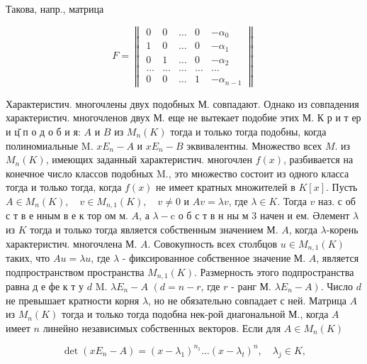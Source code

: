 \documentclass[10pt]{article}
\begin{document}
Такова, напр., матрица



\[

F=\left\|\begin{array}{ccccc}

0 & 0 & \ldots & 0 & -\alpha_{0} \\

1 & 0 & \ldots & 0 & -\alpha_{1} \\

0 & 1 & \ldots & 0 & -\alpha_{2} \\

\ldots & \ldots & \ldots & \ldots & \ldots \\

0 & 0 & \ldots & 1 & -\alpha_{n-1}

\end{array}\right\|

\]



Характеристич. многочлены двух подобных М. совпадают. Однако из совпадения характеристич. многочленов двух М. еще не вытекает подобие этих М. К р и т ер и ц̆ п о д о б и я: $A$ и $B$ из $M_{n}(K)$ тогда и только тогда подобны, когда полиномиальные M. $x E_{n}-A$ и $x E_{n}-B$ эквивалентны. Множество всех $M$. из $M_{n}(K)$, имеющих заданный характеристич. многочлен $f(x)$, разбивается на конечное число классов подобных M., это множество состоит из одного класса тогда и только тогда, когда $f(x)$ не имеет кратных множителей в $K[x]$. Пусть $A \in M_{n}(K), \quad v \in M_{n, 1}(K), \quad v \neq 0$ и $A v=\lambda v$, где $\lambda \in K$. Тогда $v$ наз. с об с т в е нным в е к тор ом м. $A$, а $\lambda-\mathrm{c}$ о б с т в н ны м 3 начен и ем. Әлемент $\lambda$ из $K$ тогда и только тогда является собственным значением М. $A$, когда $\lambda$-корень характеристич. многочлена М. $A$. Совокупность всех столбцов $u \in M_{n, 1}(K)$ таких, что $A u=\lambda u$, где $\lambda$ - фиксированное собственное значение М. $A$, является подпространством пространства $M_{n, 1}(K)$. Размерность этого подпространства равна д е фе к т у $d$ M. $\lambda E_{n}-A$ $\left(d=n-r\right.$, где $r$ - ранг М. $\left.\lambda E_{n}-A\right)$. Число $d$ не превышает кратности корня $\lambda$, но не обязательно совпадает с ней. Матрица $A$ из $M_{n}(K)$ тогда и только тогда подобна нек-рой диагональной М., когда $A$ имеет $n$ линейно независимых собственных векторов. Если для $A \in M_{n}(K)$



\[

\operatorname{det}\left(x E_{n}-A\right)=\left(x-\lambda_{1}\right)^{n_{1}} \ldots\left(x-\lambda_{t}\right)^{n}, \quad \lambda_{j} \in K,

\]
\end{document}
